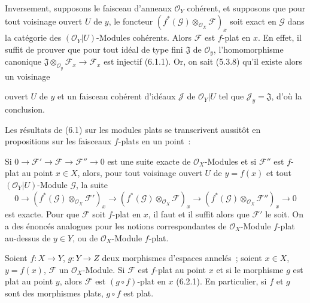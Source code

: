 \begin{env}[6.7.3]
\label{0.6.7.3-fr}
Inversement, supposons le faisceau d'anneaux $\mathcal O_Y$ cohérent, et
supposons que pour tout voisinage ouvert $U$ de $y$, le foncteur
$(f^*(\mathcal G)\otimes_{\mathcal O_X}\mathcal F)_x$ soit exact en
$\mathcal G$ dans la catégorie des $(\mathcal O_Y|U)$-Modules cohérents.
Alors $\mathcal F$ est $f$-plat en $x$. En effet, il suffit de prouver que
pour tout idéal de type fini $\mathfrak J$ de $\mathcal O_y$,
l'homomorphisme canonique
$\mathfrak J\otimes_{\mathcal O_y}\mathcal F_x\to\mathcal F_x$ est injectif
(6.1.1). Or, on sait (5.3.8) qu'il existe alors un voisinage


ouvert $U$ de $y$ et un faisceau cohérent d'idéaux $\mathcal J$ de
$\mathcal O_Y|U$ tel que $\mathcal J_y=\mathfrak J$, d'où la conclusion.
\end{env}

\begin{env}[6.7.4]
\label{0.6.7.4-fr}
Les résultats de (6.1) sur les modules plats se transcrivent aussitôt en
propositions sur les faisceaux $f$-plats en un point~:

Si $0\to\mathcal F'\to\mathcal F\to\mathcal F''\to0$ est une suite exacte
de $\mathcal O_X$-Modules et si $\mathcal F''$ est $f$-plat au point
$x\in X$, alors, pour tout voisinage ouvert $U$ de $y=f(x)$ et tout
$(\mathcal O_Y|U)$-Module $\mathcal G$, la suite
\[
  0\longrightarrow
  (f^*(\mathcal G)\otimes_{\mathcal O_X}\mathcal F')_x
  \longrightarrow
  (f^*(\mathcal G)\otimes_{\mathcal O_X}\mathcal F)_x
  \longrightarrow
  (f^*(\mathcal G)\otimes_{\mathcal O_X}\mathcal F'')_x
  \longrightarrow0
\]
est exacte. Pour que $\mathcal F$ soit $f$-plat en $x$, il faut et il suffit
alors que $\mathcal F'$ le soit. On a des énoncés analogues pour les notions
correspondantes de $\mathcal O_X$-Module $f$-plat au-dessus de $y\in Y$, ou
de $\mathcal O_X$-Module $f$-plat.
\end{env}

\begin{env}[6.7.5]
\label{0.6.7.5-fr}
Soient $f:X\to Y$, $g:Y\to Z$ deux morphismes d'espaces annelés~; soient
$x\in X$, $y=f(x)$, $\mathcal F$ un $\mathcal O_X$-Module. Si $\mathcal F$
est $f$-plat au point $x$ et si le morphisme $g$ est plat au point $y$, alors
$\mathcal F$ est $(g\circ f)$-plat en $x$ (6.2.1). En particulier, si $f$ et
$g$ sont des morphismes plats, $g\circ f$ est plat.
\end{env}

